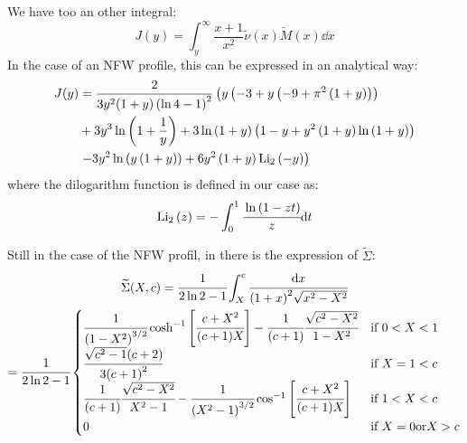 %
We have too an other integral:
%
\begin{equation}
    J(y)=\int_y^{\infty}\frac{x+1}{x^2}\widetilde{\nu}{(x)}\widetilde{M}{(x)}\dd{x}
\end{equation}
%
In the case of an NFW profile, this can be expressed in an analytical way:
%
\begin{align*}
    J(y)&=\frac{2}{3{y^2}(1+y)\left(\ln{4}-1\right)^2}\left({y}\left(-3+y\left(-9+\pi^2\left(1+y\right)\right)\right)\right.\\
    &+3{y^3}\ln\left(1+\frac{1}{y}\right)+3\ln\left(1+y\right)\left(1-y+y^2\left(1+y\right)\ln\left(1+y\right)\right)\\
    &\left.-3{y^2}\ln\left({y}\left(1+y\right)\right)+6{y^2}\left(1+y\right){\mathrm{Li}_2\left(-y\right)}\right)\\
\end{align*}
%
where the dilogarithm function is defined in our case as:
%
\begin{equation}
    \mathrm{Li}_2\left(z\right)=-\int_0^1\cfrac{\ln{(1-zt)}}{z}{\rm{d}}{t}
\end{equation}

Still in the case of the NFW profil, in \citet{MBM+10} there is the expression
of $\widetilde{\Sigma}$:
%
\begin{multline}
    \widetilde{\Sigma}(X,c)=\cfrac{1}{2\ln2-1}\int_X^c\cfrac{{\rm{d}}{x}}{{(1+x)}^2\sqrt{x^2-X^2}}\\
    =\cfrac{1}{2\ln2-1}\begin{cases}
        \cfrac{1}{{(1-X^2)}^{3/2}}
        \cosh^{-1}\left[\cfrac{c+X^2}{(c+1)X}\right]-
        \cfrac{1}{(c+1)}\cfrac{\sqrt{c^2-X^2}}{1-X^2} &\text{if } 0<X<1 \\
    \cfrac{\sqrt{c^2-1}(c+2)}{3{(c+1)}^2} &\text{if } X=1<c\\
    \cfrac{1}{(c+1)}\cfrac{\sqrt{c^2-X^2}}{X^2-1}-
    \cfrac{1}{{(X^2-1)}^{3/2}}
    \cos^{-1}\left[\cfrac{c+X^2}{(c+1)X}\right] &\text{if } 1<X<c\\
    0 &\text{if } X=0\text{or}X>c
    \end{cases}
\end{multline}
